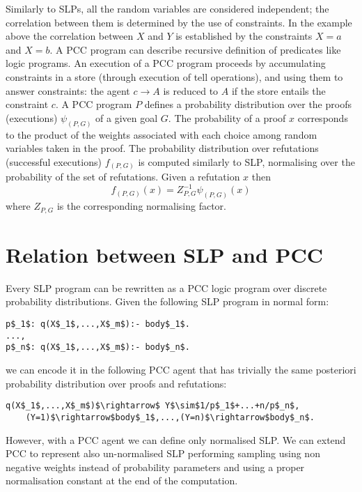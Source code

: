 \documentclass[letterpaper]{article}
\theoremstyle{plain}
\theoremstyle{definition}
\theoremstyle{remark}
\theoremstyle{definition}
\begin{document}
Similarly to SLPs, all the random variables are considered independent; the correlation between them is determined by the use of constraints. In the example above the correlation between $X$ and $Y$ is established by the constraints $X=a$ and $X=b$.
A PCC program can describe recursive definition of predicates like logic programs. 
An execution of a PCC program proceeds by accumulating constraints in a store (through execution of tell operations), and using them to answer constraints: the agent $c \rightarrow A$ is reduced to $A$ if the store entails the constraint $c$.
A PCC program $P$ defines a probability distribution over the proofs (executions) $\psi_{(P,G)}$ of a given goal $G$. The probability of a proof $x$ corresponds to the product of the weights associated with each choice among random variables taken in the proof. The probability distribution over refutations (successful executions) $f_{(P,G)}$ is computed similarly to SLP, normalising over the probability of the set of refutations. Given a refutation $x$ then $$f_{(P,G)}(x)=Z_{P,G}^{-1}\psi_{(P,G)}(x)$$ where $Z_{P,G}$ is the corresponding normalising factor.


\section{Relation between SLP and PCC}
Every SLP program  can be rewritten as a PCC logic program over discrete probability distributions.
Given the following SLP program in normal form:
\begin{lstlisting}[mathescape=true]
p$_1$: q(X$_1$,...,X$_m$):- body$_1$.
...,
p$_n$: q(X$_1$,...,X$_m$):- body$_n$.
 \end{lstlisting}
we can encode it in the following PCC agent that has trivially the same posteriori probability distribution over proofs and refutations:
\begin{lstlisting}[mathescape=true]
q(X$_1$,...,X$_m$)$\rightarrow$ Y$\sim$1/p$_1$+...+n/p$_n$, 
	(Y=1)$\rightarrow$body$_1$,...,(Y=n)$\rightarrow$body$_n$.
 \end{lstlisting}
However, with a PCC agent we can define only normalised SLP.
We can extend PCC to represent also un-normalised SLP performing sampling using non negative weights instead of probability parameters and using a proper normalisation constant at the end of the computation.
\end{document}
